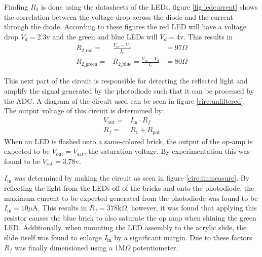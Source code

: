 Finding $R_2$ is done using the datasheets of the LEDs. figure \ref{fig:ledcurrent} shows the correlation between the voltage drop across the diode and the current through the diode.
According to these figures the red LED will have a voltage drop $V_d = 2.3$v and the green and blue LEDs will $V_d = 4$v. This results in 
\begin{eqnarray}
	R_{2\_\text{red}}=& \frac{V_{cc}-V_d}{I_c} &= 97\Omega \\
	R_{2\_\text{green}}=&R_{2\_\text{blue}} = \frac{V_{cc}-V_d}{I_c} &= 80\Omega
\end{eqnarray}

This next part of the circuit is responsible for detecting the reflected light and amplify the signal generated by the photodiode such that it can be processed by the ADC. A diagram of the circuit used can be seen in figure \ref{circ:unfiltered}.
The output voltage of this circuit is determined by:
\begin{eqnarray}
	V_{\text{out}}=&I_{\text{in}}\cdot R_f\\
	R_f =& R_1+R_{\text{pot}}
\end{eqnarray}
When an LED is flashed onto a same-colored brick, the output of the op-amp is expected to be $V_{\text{out}} = V_{\text{sat}}$, the saturation voltage. By experimentation this was found to be $V_{\text{sat}}=3.78$v.

$I_{\text{in}}$ was determined by making the circuit as seen in figure \ref{circ:iinmeasure}. By reflecting the light from the LEDs off of the bricks and onto the photodiode, the maximum current to be expected generated from the photodiode was found to be $I_{\text{in}}=10\mu$A.
This results in $R_f=378\text{k}\Omega$, however, it was found that applying this resistor causes the blue brick to also saturate the op amp when shining the green LED. Additionally, when mounting the LED assembly to the acrylic slide, the slide itself was found to enlarge $I_{\text{in}}$ by a significant margin. Due to these factors $R_f$ was finally dimensioned using a 1M$\Omega$ potentiometer. 

